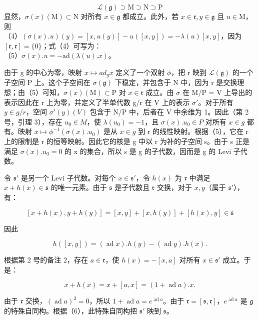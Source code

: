 \[
\mathcal{L}(\mathfrak{g}) \supset \mathrm{M} \supset \mathrm{N} \supset \mathrm{P}
\]
显然，\(\sigma (x)(\mathrm{M})\subset \mathrm{N}\) 对所有 \(x\in \mathfrak{g}\) 都成立。此外，若 \(x\in \mathfrak{r},y\in \mathfrak{g}\) 且 \(u\in \mathrm{M}\)，则\\
（4）\((\sigma (x).u)(y) = [x,u(y)] - u([x,y]) = -\lambda (u)[x,y]\)，因为 \([\mathfrak{r},\mathfrak{r}] = \{0\}\)；式（4）可写为：\\
（5）\(\sigma (x).u = -\mathrm{ad}(\lambda (u).x)\)。

由于 g 的中心为零，映射 \(x \mapsto ad_{g}x\) 定义了一个双射 \(\phi\)，把 r 映到 \(\mathcal{L}(\mathfrak{g})\) 的一个子空间 P 上。这个子空间在 \(\sigma(\mathfrak{g})\) 下稳定，并包含于 N 中，因为 r 是交换理想；由（5）可知，\(\sigma(x)(\mathrm{M}) \subset \mathrm{P}\) 对 \(x \in \mathfrak{r}\) 成立。由 \(\sigma\) 在 M/P = V 上导出的表示因此在 r 上为零，并定义了半单代数 g/r 在 V 上的表示 \(\sigma'\)。对于所有 \(y \in g/r\)，空间 \(\sigma'(y)(V)\) 包含于 N/P 中，后者在 V 中余维为 1。因此（第 2 号，引理 3），存在 \(u_{0} \in M\)，使 \(\lambda(u_{0}) = -1\)，且 \(\sigma(x).u_{0} \in P\) 对所有 \(x \in g\) 都有。映射 \(x \mapsto \phi^{-1}(\sigma(x).u_{0})\) 是从 \(x \in g\) 到 r 的线性映射。根据（5），它在 r 上的限制是 r 的恒等映射。因此它的核是 g 中以 r 为补的子空间 s。由于 s 正是满足 \(\sigma(x).u_{0} = 0\) 的 x 的集合，所以 s 是 g 的子代数，因而是 g 的 Levi 子代数。

令 \(\mathfrak{s}'\) 是另一个 Levi 子代数。对每个 \(x \in \mathfrak{s}'\)，令 \(h(x)\) 为 \(\mathfrak{r}\) 中满足 \(x + h(x) \in \mathfrak{s}\) 的唯一元素。由于 \(\mathfrak{s}\) 是子代数且 \(\mathfrak{r}\) 交换，对于 \(x, y\)（属于 \(\mathfrak{s}'\)），有：

\[
[ x + h (x), y + h (y) ] = [ x, y ] + [ x, h (y) ] + [ h (x), y ] \in \mathfrak {s}
\]

因此

\[
h ([ x, y ]) = (\operatorname{ad} x). h (y) - (\operatorname{ad} y). h (x).
\]

根据第 2 号的备注 2，存在 \(a \in \mathfrak{r}\)，使 \(h(x) = -[x, a]\) 对所有 \(x \in \mathfrak{s}'\) 成立。于是：

\[
x + h (x) = x + [ a, x ] = (1 + \operatorname{ad} a). x.\tag{6}
\]

由于 \(\mathfrak{r}\) 交换，\((\operatorname{ad} a)^2 = 0\)，所以 \(1 + \operatorname{ad} a = e^{\operatorname{ad} a}\)。由于 \(\mathfrak{r} = [\mathfrak{s}, \mathfrak{r}]\)，\(e^{\operatorname{ad} a}\) 是 \(\mathfrak{g}\) 的特殊自同构。根据（6），此特殊自同构把 \(\mathfrak{s}'\) 映到 \(\mathfrak{s}\)。

